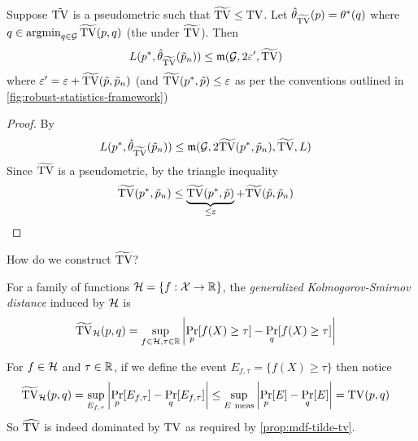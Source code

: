 \begin{proposition}\label{prop:mdf-tilde-tv}
    Suppose $\tilde{\operatorname{TV}}$ is a pseudometric such that
    $\widetilde{\operatorname{TV}} \leq \operatorname{TV}$. Let $\hat{\theta}_{\widetilde{\operatorname{TV}}}(p) = \theta^*(q)$ where
    $q \in \operatorname{argmin}_{q \in \mathcal{G}} \widetilde{\operatorname{TV}}(p, q)$ (the 
    under $\widetilde{\operatorname{TV}}$). Then
    \begin{align}
        L(p^*, \hat{\theta}_{\widetilde{\operatorname{TV}}}(\tilde{p}_n))
        &\leq \mathfrak{m}(\mathcal{G}, 2 \varepsilon', \widetilde{\operatorname{TV}})
    \end{align}
    where $\varepsilon' = \varepsilon + \widetilde{\operatorname{TV}}(\tilde{p}, \tilde{p}_n)$
    (and $\widetilde{\operatorname{TV}}(p^*, \tilde{p}) \leq \varepsilon$ as per the conventions
    outlined in \cref{fig:robust-statistics-framework})
\end{proposition}

\begin{proof}
    By 
    \begin{align}
        L(p^*, \hat{\theta}_{\widetilde{\operatorname{TV}}}(\tilde{p}_n))
        &\leq \mathfrak{m}(\mathcal{G}, 2 \widetilde{\operatorname{TV}}(p^*, \tilde{p}_n), \widetilde{\operatorname{TV}}, L)
    \end{align}
    Since $\widetilde{\operatorname{TV}}$ is a pseudometric, by the triangle
    inequality
    \begin{align}
        \widetilde{\operatorname{TV}}(p^*, \tilde{p}_n)
        &\leq \underbrace{\widetilde{\operatorname{TV}}(p^*, \tilde{p})}_{\leq \varepsilon} + \widetilde{\operatorname{TV}}(\tilde{p}, \tilde{p}_n)
    \end{align}
\end{proof}

How do we construct $\widetilde{\operatorname{TV}}$?
\begin{definition}\label{def:tilde-tv}
    For a family of functions $\mathcal{H} = \{ f : \mathcal{X} \to \mathbb{R} \}$,
    the \emph{generalized Kolmogorov-Smirnov distance}
    induced by $\mathcal{H}$ is
    \begin{align}
        \widetilde{\operatorname{TV}}_{\mathcal{H}}(p, q) &= \sup_{f \in \mathcal{H}, \tau \in \mathbb{R}}
        \left\lvert \Pr_p[f(X) \geq \tau] - \Pr_q[f(X) \geq \tau] \right\rvert
    \end{align}
\end{definition}

\begin{remark}
    For $f \in \mathcal{H}$ and $\tau \in \mathbb{R}$, if we define the event
    $E_{f,\tau} = \{f(X) \geq \tau\}$ then notice
    \begin{align}
        \widetilde{\operatorname{TV}}_{\mathcal{H}}(p,q)
        = \sup_{E_{f,\tau}} \left\lvert
            \Pr_p[E_{f,\tau}] - \Pr_q[E_{f,\tau}]
        \right\rvert
        &\leq \sup_{E~\text{meas}} \left\lvert
            \Pr_p[E] - \Pr_q[E]
        \right\rvert
        = \operatorname{TV}(p,q)
    \end{align}
    So $\widehat{\operatorname{TV}}$ is indeed dominated by $\operatorname{TV}$ as required by
    \cref{prop:mdf-tilde-tv}.
\end{remark}


